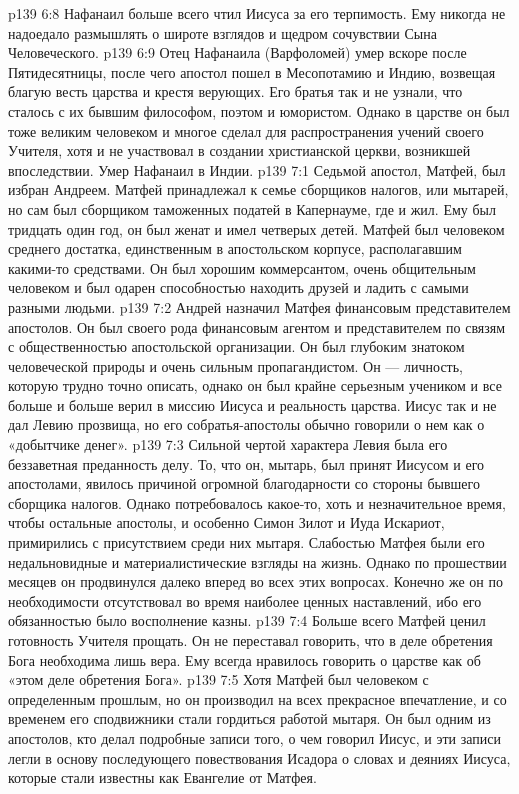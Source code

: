 \vs p139 6:8 \pc Нафанаил больше всего чтил Иисуса за его терпимость. Ему никогда не надоедало размышлять о широте взглядов и щедром сочувствии Сына Человеческого.
\vs p139 6:9 \pc Отец Нафанаила (Варфоломей) умер вскоре после Пятидесятницы, после чего апостол пошел в Месопотамию и Индию, возвещая благую весть царства и крестя верующих. Его братья так и не узнали, что сталось с их бывшим философом, поэтом и юмористом. Однако в царстве он был тоже великим человеком и многое сделал для распространения учений своего Учителя, хотя и не участвовал в создании христианской церкви, возникшей впоследствии. Умер Нафанаил в Индии.
\vs p139 7:1 Седьмой апостол, Матфей, был избран Андреем. Матфей принадлежал к семье сборщиков налогов, или мытарей, но сам был сборщиком таможенных податей в Капернауме, где и жил. Ему был тридцать один год, он был женат и имел четверых детей. Матфей был человеком среднего достатка, единственным в апостольском корпусе, располагавшим какими\hyp{}то средствами. Он был хорошим коммерсантом, очень общительным человеком и был одарен способностью находить друзей и ладить с самыми разными людьми.
\vs p139 7:2 \pc Андрей назначил Матфея финансовым представителем апостолов. Он был своего рода финансовым агентом и представителем по связям с общественностью апостольской организации. Он был глубоким знатоком человеческой природы и очень сильным пропагандистом. Он --- личность, которую трудно точно описать, однако он был крайне серьезным учеником и все больше и больше верил в миссию Иисуса и реальность царства. Иисус так и не дал Левию прозвища, но его собратья\hyp{}апостолы обычно говорили о нем как о «добытчике денег».
\vs p139 7:3 Сильной чертой характера Левия была его беззаветная преданность делу. То, что он, мытарь, был принят Иисусом и его апостолами, явилось причиной огромной благодарности со стороны бывшего сборщика налогов. Однако потребовалось какое\hyp{}то, хоть и незначительное время, чтобы остальные апостолы, и особенно Симон Зилот и Иуда Искариот, примирились с присутствием среди них мытаря. Слабостью Матфея были его недальновидные и материалистические взгляды на жизнь. Однако по прошествии месяцев он продвинулся далеко вперед во всех этих вопросах. Конечно же он по необходимости отсутствовал во время наиболее ценных наставлений, ибо его обязанностью было восполнение казны.
\vs p139 7:4 Больше всего Матфей ценил готовность Учителя прощать. Он не переставал говорить, что в деле обретения Бога необходима лишь вера. Ему всегда нравилось говорить о царстве как об «этом деле обретения Бога».
\vs p139 7:5 \pc Хотя Матфей был человеком с определенным прошлым, но он производил на всех прекрасное впечатление, и со временем его сподвижники стали гордиться работой мытаря. Он был одним из апостолов, кто делал подробные записи того, о чем говорил Иисус, и эти записи легли в основу последующего повествования Исадора о словах и деяниях Иисуса, которые стали известны как Евангелие от Матфея.
